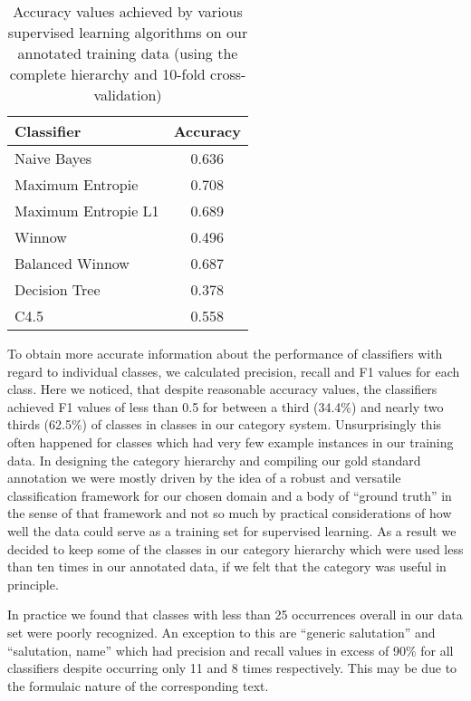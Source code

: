 \begin{table}
 \centering
 \begin{tabular}{l c}
  \toprule
  \textbf{Classifier} & \textbf{Accuracy} \\
  \midrule
  Naive Bayes			& 0.636	\\
  Maximum Entropie		& 0.708 \\ 
  Maximum Entropie L1	& 0.689	\\	
  Winnow				& 0.496	\\
  Balanced Winnow		& 0.687	\\
  Decision Tree			& 0.378 \\
  C4.5					& 0.558	\\
  \bottomrule
 \end{tabular}
 \caption{Accuracy values achieved by various supervised learning algorithms on our annotated training data (using the complete hierarchy and 10-fold cross-validation)}
 \label{tab:accuracy}
\end{table}



To obtain more accurate information about the performance of classifiers with regard to individual classes, we calculated precision, recall and F1 values for each class. Here we noticed, that despite reasonable accuracy values, the classifiers achieved F1 values of less than 0.5 for between a third (34.4\%) and nearly two thirds (62.5\%) of classes in classes in our category system. Unsurprisingly this often happened for classes which had very few example instances in our training data. In designing the category hierarchy and compiling our gold standard annotation we were mostly driven by the idea of a robust and versatile classification framework for our chosen domain and a body of ``ground truth'' in the sense of that framework and not so much by practical considerations of how well the data could serve as a training set for supervised learning. As a result we decided to keep some of the classes in our category hierarchy which were used less than ten times in our annotated data, if we felt that the category was useful in principle.

In practice we found that classes with less than 25 occurrences overall in our data set were poorly recognized. An exception to this are ``generic salutation'' and ``salutation, name'' which had precision and recall values in excess of 90\% for all classifiers despite occurring only 11 and 8 times respectively. This may be due to the formulaic nature of the corresponding text.

